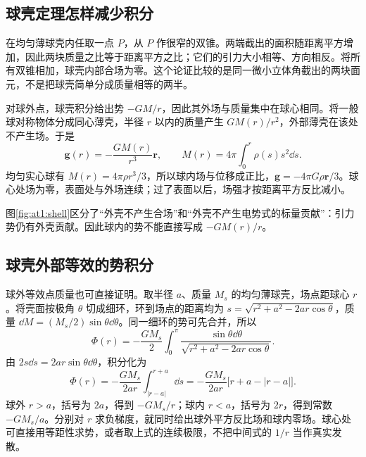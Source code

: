 \subsection{球壳定理怎样减少积分}

在均匀薄球壳内任取一点 $P$，从 $P$ 作很窄的双锥。两端截出的面积随距离平方增加，因此两块质量之比等于距离平方之比；它们的引力大小相等、方向相反。将所有双锥相加，球壳内部合场为零。这个论证比较的是同一微小立体角截出的两块面元，不是把球壳简单分成质量相等的两半。

对球外点，球壳积分给出势 $-GM/r$，因此其外场与质量集中在球心相同。将一般球对称物体分成同心薄壳，半径 $r$ 以内的质量产生 $GM(r)/r^2$，外部薄壳在该处不产生场。于是
\[
 \bm g(r)=-\frac{GM(r)}{r^3}\bm r,\qquad
 M(r)=4\pi\int_0^r\rho(s)s^2\dd s.
\]
均匀实心球有 $M(r)=4\pi\rho r^3/3$，所以球内场与位移成正比，$\bm g=-4\pi G\rho\bm r/3$。球心处场为零，表面处与外场连续；过了表面以后，场强才按距离平方反比减小。

图\ref{fig:at1:shell}区分了“外壳不产生合场”和“外壳不产生电势式的标量贡献”：引力势仍有外壳贡献。因此球内的势不能直接写成 $-GM(r)/r$。\subsection{球壳外部等效的势积分}

  球外等效点质量也可直接证明。取半径 $a$、质量 $M_s$ 的均匀薄球壳，场点距球心 $r$。将壳面按极角 $\theta$ 切成细环，环到场点的距离均为 $s=\sqrt{r^2+a^2-2ar\cos\theta}$，质量 $\dd M=(M_s/2)\sin\theta\dd\theta$。同一细环的势可先合并，所以
  \[\Phi(r)=-\frac{GM_s}{2}\int_0^\pi\frac{\sin\theta\dd\theta}{\sqrt{r^2+a^2-2ar\cos\theta}}.
  \]
  由 $2s\dd s=2ar\sin\theta\dd\theta$，积分化为
  \[\Phi(r)=-\frac{GM_s}{2ar}\int_{|r-a|}^{r+a}\dd s
  =-\frac{GM_s}{2ar}\big[r+a-|r-a|\big].\]
  球外 $r>a$，括号为 $2a$，得到 $-GM_s/r$；球内 $r<a$，括号为 $2r$，得到常数 $-GM_s/a$。分别对 $r$ 求负梯度，就同时给出球外平方反比场和球内零场。球心处可直接用等距性求势，或者取上式的连续极限，不把中间式的 $1/r$ 当作真实发散。
  
